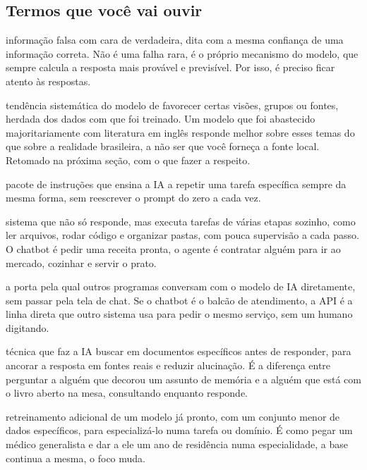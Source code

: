 \documentclass[11pt,a4paper]{article}
\begin{document}
\subsection*{Termos que você vai ouvir}
\begin{description}[style=nextline,leftmargin=0pt,itemsep=6pt]
  \item[\poppinsmed\color{azulUNI}Alucinação] informação falsa com cara de verdadeira, dita com a mesma confiança de uma informação correta. Não é uma falha rara, é o próprio mecanismo do modelo, que sempre calcula a resposta mais provável e previsível. Por isso, é preciso ficar atento às respostas.
  \item[\poppinsmed\color{azulUNI}Viés algorítmico] tendência sistemática do modelo de favorecer certas visões, grupos ou fontes, herdada dos dados com que foi treinado. Um modelo que foi abastecido majoritariamente com literatura em inglês responde melhor sobre esses temas do que sobre a realidade brasileira, a não ser que você forneça a fonte local. Retomado na próxima seção, com o que fazer a respeito.
  \item[\poppinsmed\color{azulUNI}Habilidade/Skill] pacote de instruções que ensina a IA a repetir uma tarefa específica sempre da mesma forma, sem reescrever o prompt do zero a cada vez.
  \item[\poppinsmed\color{azulUNI}Agente (de IA)] sistema que não só responde, mas executa tarefas de várias etapas sozinho, como ler arquivos, rodar código e organizar pastas, com pouca supervisão a cada passo. O chatbot é pedir uma receita pronta, o agente é contratar alguém para ir ao mercado, cozinhar e servir o prato.
  \item[\poppinsmed\color{azulUNI}API] a porta pela qual outros programas conversam com o modelo de IA diretamente, sem passar pela tela de chat. Se o chatbot é o balcão de atendimento, a API é a linha direta que outro sistema usa para pedir o mesmo serviço, sem um humano digitando.
  \item[\poppinsmed\color{azulUNI}RAG (geração aumentada por recuperação)] técnica que faz a IA buscar em documentos específicos antes de responder, para ancorar a resposta em fontes reais e reduzir alucinação. É a diferença entre perguntar a alguém que decorou um assunto de memória e a alguém que está com o livro aberto na mesa, consultando enquanto responde.
  \item[\poppinsmed\color{azulUNI}Fine-tuning (ajuste fino)] retreinamento adicional de um modelo já pronto, com um conjunto menor de dados específicos, para especializá-lo numa tarefa ou domínio. É como pegar um médico generalista e dar a ele um ano de residência numa especialidade, a base continua a mesma, o foco muda.

\end{description}
\end{document}
